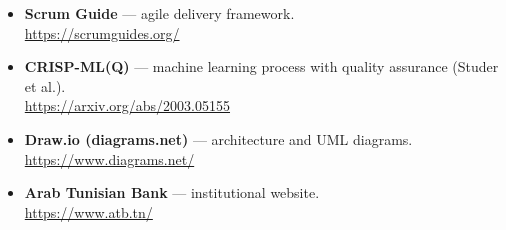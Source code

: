 \documentclass[a4paper, oneside, 12pt, final]{extreport}
\begin{document}
\begin{itemize}
          \url{https://ai.google.dev/gemini-api/docs}
    \item \textbf{Scrum Guide} --- agile delivery framework.\\
          \url{https://scrumguides.org/}
    \item \textbf{CRISP-ML(Q)} --- machine learning process with quality assurance
          (Studer et al.).\\
          \url{https://arxiv.org/abs/2003.05155}
    \item \textbf{Draw.io (diagrams.net)} --- architecture and UML diagrams.\\
          \url{https://www.diagrams.net/}
    \item \textbf{Arab Tunisian Bank} --- institutional website.\\
          \url{https://www.atb.tn/}
\end{itemize}

\cleardoublepage%


\printindex
\end{document}
